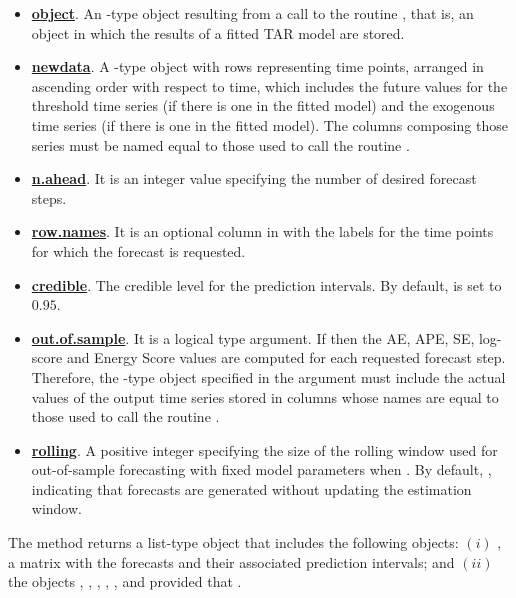 \begin{itemize}
\item \underline{\bf object}. An -type object resulting from a call to the routine , that is, an object in which the results of a fitted TAR model are stored.
\item \underline{\bf newdata}. A -type object with rows representing time points, arranged in ascending order with respect to time, which includes the future values for the threshold time series (if there is one in the fitted model) and the exogenous time series (if there is one in the fitted model). The columns composing those series must be named equal to those used to call the routine .

\item \underline{\bf n.ahead}. It is an integer value specifying the number of desired forecast steps.

\item \underline{\bf row.names}. It is an optional column in  with the labels for the time points for which the forecast is requested.

\item \underline{\bf credible}. The credible level for the prediction intervals. By default,  is set to $0.95$.

\item \underline{\bf out.of.sample}. It is a logical type argument. If  then the AE, APE, SE, log-score and Energy Score values are computed for each requested forecast step. Therefore, the -type object specified in the argument  must include the actual values of the output time series stored in columns whose names are equal to those used to call the routine .

\item \underline{\bf rolling}. A positive integer specifying the size of the rolling window used for out-of-sample forecasting with fixed model parameters when . By default, , indicating that forecasts are generated without updating the estimation window.
\end{itemize}

The method  returns a list-type object that includes the following objects: $(i)$ , a matrix with the forecasts and their associated prediction intervals; and $(ii)$ the objects , , , , ,  and  provided that . 

